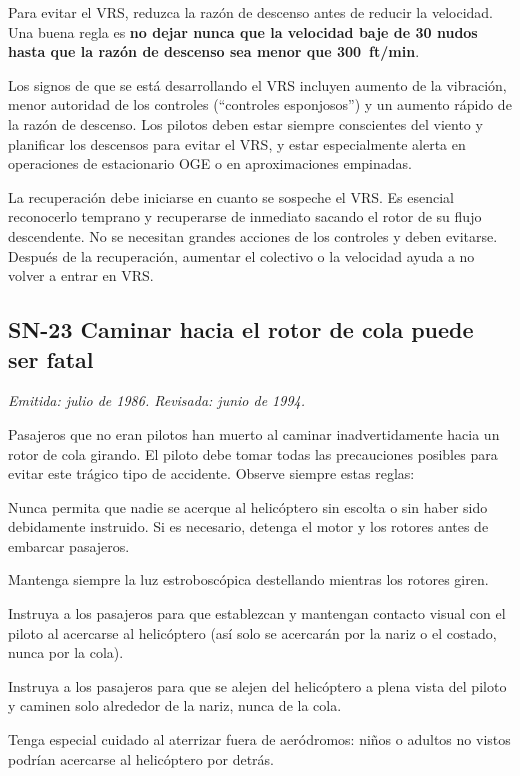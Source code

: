 Para evitar el VRS, reduzca la razón de descenso antes de reducir la velocidad. Una buena regla es \textbf{no dejar nunca que la velocidad baje de 30 nudos hasta que la razón de descenso sea menor que 300~ft/min}.

Los signos de que se está desarrollando el VRS incluyen aumento de la vibración, menor autoridad de los controles (``controles esponjosos'') y un aumento rápido de la razón de descenso. Los pilotos deben estar siempre conscientes del viento y planificar los descensos para evitar el VRS, y estar especialmente alerta en operaciones de estacionario OGE o en aproximaciones empinadas.

La recuperación debe iniciarse en cuanto se sospeche el VRS. Es esencial reconocerlo temprano y recuperarse de inmediato sacando el rotor de su flujo descendente. No se necesitan grandes acciones de los controles y deben evitarse. Después de la recuperación, aumentar el colectivo o la velocidad ayuda a no volver a entrar en VRS.

\subsection*{SN-23 \quad Caminar hacia el rotor de cola puede ser fatal}
{\small\textit{Emitida: julio de 1986. Revisada: junio de 1994.}}

Pasajeros que no eran pilotos han muerto al caminar inadvertidamente hacia un rotor de cola girando. El piloto debe tomar todas las precauciones posibles para evitar este trágico tipo de accidente. Observe siempre estas reglas:

\begin{pasos}
\item Nunca permita que nadie se acerque al helicóptero sin escolta o sin haber sido debidamente instruido. Si es necesario, detenga el motor y los rotores antes de embarcar pasajeros.
\item Mantenga siempre la luz estroboscópica destellando mientras los rotores giren.
\item Instruya a los pasajeros para que establezcan y mantengan contacto visual con el piloto al acercarse al helicóptero (así solo se acercarán por la nariz o el costado, nunca por la cola).
\item Instruya a los pasajeros para que se alejen del helicóptero a plena vista del piloto y caminen solo alrededor de la nariz, nunca de la cola.
\item Tenga especial cuidado al aterrizar fuera de aeródromos: niños o adultos no vistos podrían acercarse al helicóptero por detrás.
\end{pasos}

